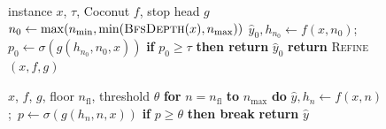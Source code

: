 \begin{figure}[H]
\centering
\begin{minipage}[t]{0.48\linewidth}
\label{alg:conf-fallback}
\scriptsize
\begin{algorithmic}[1]
\Require instance $x$, $\tau$, Coconut $f$, stop head $g$
\State $n_0 \leftarrow \max(n_{\min},\min(\textsc{BfsDepth}(x),n_{\max}))$
\State $\hat y_0, h_{n_0} \leftarrow f(x,n_0)$;\ $p_0 \leftarrow \sigma(g(h_{n_0},n_0,x))$
\State \textbf{if} $p_0 \ge \tau$ \textbf{then return} $\hat y_0$
\State \textbf{return} \textsc{Refine}$(x,f,g)$
\end{algorithmic}
\end{minipage}\hfill
\begin{minipage}[t]{0.48\linewidth}
\label{alg:refinement}
\scriptsize
\begin{algorithmic}[1]
\Require $x$, $f$, $g$, floor $n_{\mathrm{fl}}$, threshold $\theta$
\State \textbf{for} $n = n_{\mathrm{fl}}$ \textbf{to} $n_{\max}$ \textbf{do}
\State \hspace{1em}$\hat y, h_n \leftarrow f(x,n)$;\ $p \leftarrow \sigma(g(h_n,n,x))$
\State \hspace{1em}\textbf{if} $p \ge \theta$ \textbf{then break}
\State \textbf{return} $\hat y$
\end{algorithmic}
\end{minipage}
\end{figure}

